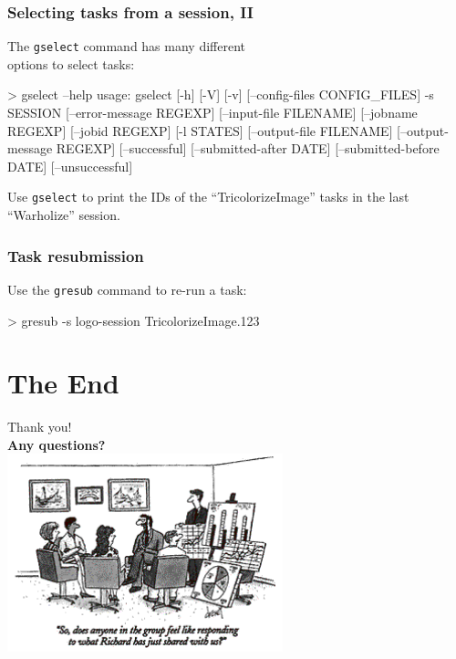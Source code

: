 \documentclass[english,serif,mathserif,usenames,dvipsnames]{beamer}
\begin{document}
\begin{frame}[fragile]
  \frametitle{Selecting tasks from a session, II}

  The \texttt{gselect} command has many different \\ options to select tasks:
  \begin{stdout}
> gselect --help
usage: gselect [-h] [-V] [-v] [--config-files CONFIG_FILES] -s SESSION
               [--error-message REGEXP] [--input-file FILENAME]
               [--jobname REGEXP] [--jobid REGEXP] [-l STATES]
               [--output-file FILENAME] [--output-message REGEXP]
               [--successful] [--submitted-after DATE]
               [--submitted-before DATE] [--unsuccessful]
  \end{stdout}

  \+
  \begin{exercise*}
    Use \texttt{gselect} to print the IDs of the ``TricolorizeImage''
    tasks in the last ``Warholize'' session.
  \end{exercise*}
\end{frame}

\begin{frame}
  \frametitle{Task resubmission}
  Use the \texttt{gresub} command to re-run a task:
  \begin{stdout}
> gresub -s logo-session TricolorizeImage.123
  \end{stdout}
\end{frame}


\section{The End}

\begin{frame}
  \begin{center}
    {\Huge Thank you!}
    \\[2em]
    \textbf{Any questions?}
    \\[0.5em]
    \includegraphics[width=0.6\textwidth]{fig/questions.png}
  \end{center}
\end{frame}
\end{document}
